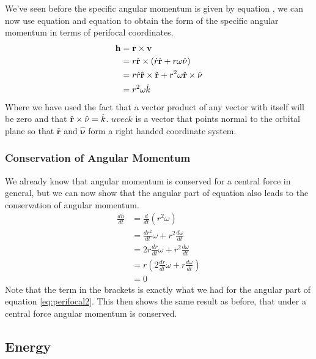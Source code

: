 We've seen before the specific angular momentum is given by equation ,
we can now use equation  and equation  to obtain the form of the specific angular momentum in
terms of perifocal coordinates.
\begin{align}
\mathbf{h} &= \mathbf{r} \times \mathbf{v} \nonumber \\
&= r \hat{\mathbf{r}} \times \left(\dot{r} \hat{\mathbf{r}} + r \omega \hat{\mathbf{\nu}}\right) \nonumber \\
&=  r \dot{r} \hat{\mathbf{r}} \times \hat{\mathbf{r}} + r^2 \omega \hat{\mathbf{r}} \times\hat{\mathbf{\nu}}\nonumber \\
&=  r^2 \omega \hat{k}
\end{align}
Where we have used the fact that a vector product of any vector with itself will be zero and that $\hat{\mathbf{r}} \times\hat{\mathbf{\nu}} = \hat{k}$.
$uveck$ is a vector that points normal to the orbital plane so that $\hat{\mathbf{r}}$ and $\hat{\mathbf{\nu}}$ form a right handed coordinate system.

\subsubsection{Conservation of Angular Momentum}

We already know that angular momentum is conserved for a central force in general, but we can now show that the angular part of equation  
also leads to the conservation of angular momentum.
\begin{align}
\frac{dh}{dt}&=\frac{d}{dt}(r^2 \omega)\nonumber \\
&=\frac{dr^2}{dt}\omega + r^2 \frac{d\omega}{dt} \nonumber \\
&=2r\frac{dr}{dt}\omega + r^2 \frac{d\omega}{dt} \nonumber \\
&=r\left(2\frac{dr}{dt}\omega + r \frac{d\omega}{dt}\right) \nonumber \\
&=0
\end{align}
Note that the term in the brackets is exactly what we had for the angular part of equation \ref{eq:perifocal2}.
This then shows the same result as before, that under a central force angular momentum is conserved.

\subsection{Energy}

